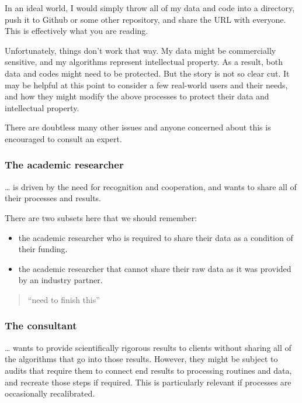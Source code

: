 \documentclass[11pt,]{article}
\providecommand{\tightlist}{%
  \setlength{\itemsep}{0pt}\setlength{\parskip}{0pt}}
\begin{document}
In an ideal world, I would simply throw all of my data and code into a directory, push it to Github or some other repository, and share the URL with everyone. This is effectively what you are reading.

Unfortunately, things don't work that way. My data might be commercially sensitive, and my algorithms represent intellectual property. As a result, both data and codes might need to be protected. But the story is not so clear cut. It may be helpful at this point to consider a few real-world users and their needs, and how they might modify the above processes to protect their data and intellectual property.

There are doubtless many other issues and anyone concerned about this is encouraged to consult an expert.

\hypertarget{the-academic-researcher}{%
\subsubsection{The academic researcher}\label{the-academic-researcher}}

\ldots{} is driven by the need for recognition and cooperation, and wants to share all of their processes and results.

There are two subsets here that we should remember:

\begin{itemize}
\tightlist
\item
  the academic researcher who is required to share their data as a condition of their funding.
\item
  the academic researcher that cannot share their raw data as it was provided by an industry partner.
\end{itemize}

\begin{quote}
``need to finish this''
\end{quote}

\hypertarget{the-consultant}{%
\subsubsection{The consultant}\label{the-consultant}}

\ldots{} wants to provide scientifically rigorous results to clients without sharing all of the algorithms that go into those results. However, they might be subject to audits that require them to connect end results to processing routines and data, and recreate those steps if required. This is particularly relevant if processes are occasionally recalibrated.
\end{document}
